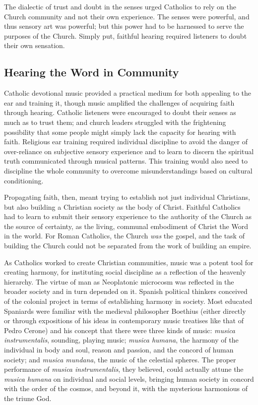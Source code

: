 The dialectic of trust and doubt in the senses urged Catholics to rely on the
Church community and not their own experience.
The senses were powerful, and thus sensory art was powerful; but this power had
to be harnessed to serve the purposes of the Church.
Simply put, faithful hearing required listeners to doubt their own sensation.


\subsection{Hearing the Word in Community}

Catholic devotional music provided a practical medium for both appealing to the
ear and training it, though music amplified the challenges of acquiring faith
through hearing.
Catholic listeners were encouraged to doubt their senses as much as to trust
them; and church leaders struggled with the frightening possibility that some
people might simply lack the capacity for hearing with faith.
Religious ear training required individual discipline to avoid the danger of
over-reliance on subjective sensory experience and to learn to discern the
spiritual truth communicated through musical patterns.
This training would also need to discipline the whole community to overcome
misunderstandings based on cultural conditioning.

Propagating faith, then, meant trying to establish not just individual
Christians, but also building a Christian society as the body of Christ.
Faithful Catholics had to learn to submit their sensory experience to the
authority of the Church as the source of certainty, as the living, communal
embodiment of Christ the Word in the world.
For Roman Catholics, the Church \emph{was} the gospel, and the task of building
the Church could not be separated from the work of building an empire.

As Catholics worked to create Christian communities, music was a potent tool for
creating harmony, for instituting social discipline as a reflection of the
heavenly hierarchy.%
    \Autocites{Baker:Harmony}{Irving:Colonial}{Illari:Polychoral}
The virtue of man as Neoplatonic microcosm was reflected in the broader society
and in turn depended on it.
Spanish political thinkers conceived of the colonial project in terms of
establishing harmony in society.%
    \Autocite[22--31]{Baker:Harmony}
Most educated Spaniards were familiar with the medieval philosopher Boethius
(either directly or through expositions of his ideas in contemporary music
treatises like that of Pedro Cerone) and his concept that there were three kinds
of music: \emph{musica instrumentalis}, sounding, playing music; \emph{musica
humana}, the harmony of the individual in body and soul, reason and passion, and
the concord of human society; and \emph{musica mundana}, the music of the
celestial spheres.%
    \Autocites
    [bk.~2, pp.~187--189]{Cerone:Melopeo}
    [203--208]{Boethius:Musica}
The proper performance of \emph{musica instrumentalis}, they believed, could
actually attune the \emph{musica humana} on individual and social levels,
bringing human society in concord with the order of the cosmos, and beyond it,
with the mysterious harmonious of the triune God.


